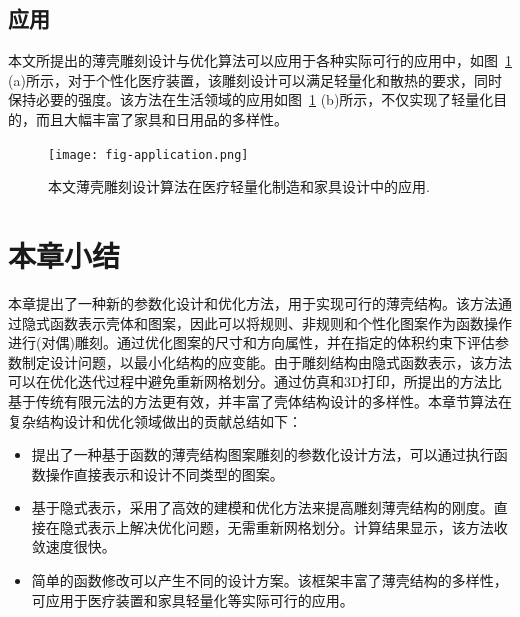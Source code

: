 \subsection{应用}
本文所提出的薄壳雕刻设计与优化算法可以应用于各种实际可行的应用中，如图~\ref{fig-application} (a)所示，对于个性化医疗装置，该雕刻设计可以满足轻量化和散热的要求，同时保持必要的强度。该方法在生活领域的应用如图~\ref{fig-application} (b)所示，不仅实现了轻量化目的，而且大幅丰富了家具和日用品的多样性。
\begin{figure}[htbp]
	\begin{center}
		\texttt{[image: fig-application.png]}
	\end{center}
	\caption{本文薄壳雕刻设计算法在医疗轻量化制造和家具设计中的应用.}
	\label{fig-application}
\end{figure}

\section{本章小结}
本章提出了一种新的参数化设计和优化方法，用于实现可行的薄壳结构。该方法通过隐式函数表示壳体和图案，因此可以将规则、非规则和个性化图案作为函数操作进行(对偶)雕刻。通过优化图案的尺寸和方向属性，并在指定的体积约束下评估参数制定设计问题，以最小化结构的应变能。由于雕刻结构由隐式函数表示，该方法可以在优化迭代过程中避免重新网格划分。通过仿真和3D打印，所提出的方法比基于传统有限元法的方法更有效，并丰富了壳体结构设计的多样性。本章节算法在复杂结构设计和优化领域做出的贡献总结如下：
\begin{itemize}
    \item 提出了一种基于函数的薄壳结构图案雕刻的参数化设计方法，可以通过执行函数操作直接表示和设计不同类型的图案。
    \item 基于隐式表示，采用了高效的建模和优化方法来提高雕刻薄壳结构的刚度。直接在隐式表示上解决优化问题，无需重新网格划分。计算结果显示，该方法收敛速度很快。
    \item 简单的函数修改可以产生不同的设计方案。该框架丰富了薄壳结构的多样性，可应用于医疗装置和家具轻量化等实际可行的应用。
\end{itemize}